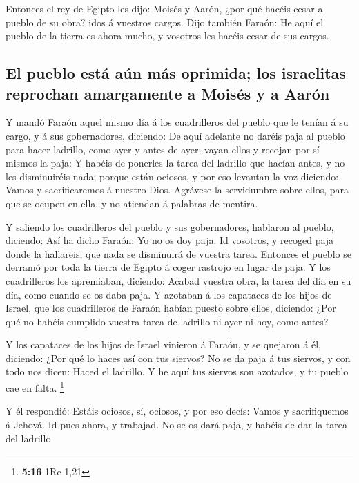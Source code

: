  Entonces el rey de Egipto les dijo: Moisés y Aarón, ¿por
qué hacéis cesar al pueblo de su obra? idos á vuestros cargos.
 Dijo también Faraón: He aquí el pueblo de la tierra es
ahora mucho, y vosotros les hacéis cesar de sus cargos.

\hypertarget{el-pueblo-estuxe1-auxfan-muxe1s-oprimida-los-israelitas-reprochan-amargamente-a-moisuxe9s-y-a-aaruxf3n}{%
\subsection{El pueblo está aún más oprimida; los israelitas reprochan
amargamente a Moisés y a
Aarón}\label{el-pueblo-estuxe1-auxfan-muxe1s-oprimida-los-israelitas-reprochan-amargamente-a-moisuxe9s-y-a-aaruxf3n}}

 Y mandó Faraón aquel mismo día á los cuadrilleros del
pueblo que le tenían á su cargo, y á sus gobernadores, diciendo:
 De aquí adelante no daréis paja al pueblo para hacer
ladrillo, como ayer y antes de ayer; vayan ellos y recojan por sí mismos
la paja:  Y habéis de ponerles la tarea del ladrillo que
hacían antes, y no les disminuiréis nada; porque están ociosos, y por
eso levantan la voz diciendo: Vamos y sacrificaremos á nuestro Dios.
 Agrávese la servidumbre sobre ellos, para que se ocupen en
ella, y no atiendan á palabras de mentira.

 Y saliendo los cuadrilleros del pueblo y sus gobernadores,
hablaron al pueblo, diciendo: Así ha dicho Faraón: Yo no os doy paja.
 Id vosotros, y recoged paja donde la hallareis; que nada
se disminuirá de vuestra tarea.  Entonces el pueblo se
derramó por toda la tierra de Egipto á coger rastrojo en lugar de paja.
 Y los cuadrilleros los apremiaban, diciendo: Acabad
vuestra obra, la tarea del día en su día, como cuando se os daba paja.
 Y azotaban á los capataces de los hijos de Israel, que los
cuadrilleros de Faraón habían puesto sobre ellos, diciendo: ¿Por qué no
habéis cumplido vuestra tarea de ladrillo ni ayer ni hoy, como antes?

 Y los capataces de los hijos de Israel vinieron á Faraón,
y se quejaron á él, diciendo: ¿Por qué lo haces así con tus siervos?
 No se da paja á tus siervos, y con todo nos dicen: Haced
el ladrillo. Y he aquí tus siervos son azotados, y tu pueblo cae en
falta. \footnote{\textbf{5:16} 1Re 1,21}

 Y él respondió: Estáis ociosos, sí, ociosos, y por eso
decís: Vamos y sacrifiquemos á Jehová.  Id pues ahora, y
trabajad. No se os dará paja, y habéis de dar la tarea del ladrillo.


